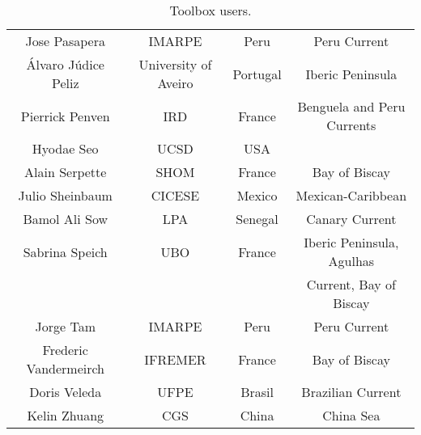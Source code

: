 \begin{table}[!ht]
\begin{center}
\begin{tabular}{|c|c|c|c|}
Jose Pasapera & IMARPE & Peru & Peru Current \\
\'Alvaro J\'udice Peliz & University of Aveiro & Portugal & Iberic Peninsula  \\
Pierrick Penven & IRD & France & Benguela and Peru Currents \\
Hyodae Seo & UCSD & USA &  \\
Alain Serpette & SHOM & France & Bay of Biscay \\
Julio Sheinbaum & CICESE & Mexico & Mexican-Caribbean \\
Bamol Ali Sow & LPA & Senegal & Canary Current \\
Sabrina Speich & UBO & France & Iberic Peninsula, Agulhas\\
               &     &        & Current, Bay of Biscay \\
Jorge Tam & IMARPE & Peru & Peru Current \\
Frederic Vandermeirch & IFREMER & France & Bay of Biscay \\
Doris Veleda  & UFPE & Brasil & Brazilian Current \\
Kelin Zhuang  & CGS & China & China Sea \\
\hline
\end{tabular}
\caption{Toolbox users.}
\end{center}
\end{table}
